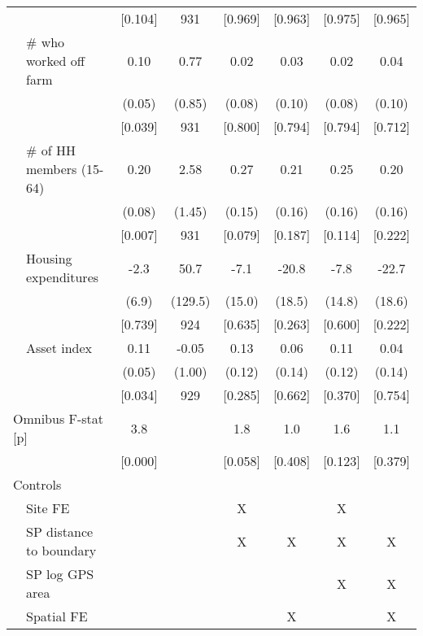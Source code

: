 \begin{tabular}{llcccccc}
 & & [0.104] & 931 & [0.969] & [0.963] & [0.975] & [0.965] \\[0.5em]
 & \hspace{0.5em}\# who worked off farm & 0.10 & 0.77 & 0.02 & 0.03 & 0.02 & 0.04 \\
 & & (0.05) & (0.85) & (0.08) & (0.10) & (0.08) & (0.10) \\
 & & [0.039] & 931 & [0.800] & [0.794] & [0.794] & [0.712] \\[0.5em]
 & \# of HH members (15-64) & 0.20 & 2.58 & 0.27 & 0.21 & 0.25 & 0.20 \\
 & & (0.08) & (1.45) & (0.15) & (0.16) & (0.16) & (0.16) \\
 & & [0.007] & 931 & [0.079] & [0.187] & [0.114] & [0.222] \\[0.5em]
 & Housing expenditures & -2.3 & 50.7 & -7.1 & -20.8 & -7.8 & -22.7 \\
 & & (6.9) & (129.5) & (15.0) & (18.5) & (14.8) & (18.6) \\
 & & [0.739] & 924 & [0.635] & [0.263] & [0.600] & [0.222] \\[0.5em]
 & Asset index & 0.11 & -0.05 & 0.13 & 0.06 & 0.11 & 0.04 \\
 & & (0.05) & (1.00) & (0.12) & (0.14) & (0.12) & (0.14) \\
 & & [0.034] & 929 & [0.285] & [0.662] & [0.370] & [0.754] \\[0.5em]
\multicolumn{2}{l}{Omnibus F-stat [p]} & 3.8 &  & 1.8 & 1.0 & 1.6 & 1.1 \\
&  & [0.000] &  & [0.058] & [0.408] & [0.123] & [0.379] \\[0.5em]
\hline
\multicolumn{2}{l}{Controls} & & & & & & \\
\cmidrule(lr){1-2}
 & Site FE &  &  & X &  & X &  \\
 & SP distance to boundary &  &  & X & X & X & X \\
 & SP log GPS area &  &  &  &  & X & X \\
 & Spatial FE &  &  &  & X &  & X \\
\hline
\end{tabular}
